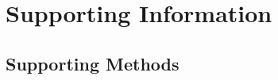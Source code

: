 \documentclass[12pt]{article}\usepackage[]{graphicx}\usepackage[dvipsnames]{xcolor}
\begin{document}
\setcounter{figure}{0}
\setcounter{table}{0}
\setcounter{equation}{0}
\setcounter{section}{0}

\renewcommand{\thesection}{S.\arabic{section}}

\renewcommand{\theequation}{S\arabic{equation}}

\renewcommand{\figurename}{Fig}       %
\renewcommand{\thefigure}{S\arabic{figure}}  %



\renewcommand{\thetable}{S\arabic{table}}
\renewcommand{\tablename}{Table}    %

\section{Supporting Information}

\subsection{Supporting Methods}
\end{document}

